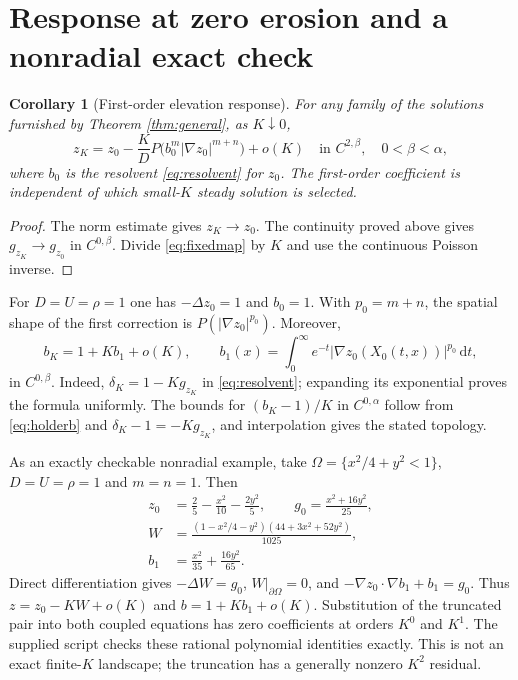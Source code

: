 \documentclass[11pt,a4paper]{article}
\newtheorem{corollary}[theorem]{Corollary}
\theoremstyle{definition}\newtheorem{definition}[theorem]{Definition}
\theoremstyle{remark}\newtheorem{remark}[theorem]{Remark}
\newcommand{\dd}{\,\mathrm d}
\begin{document}
\section{Response at zero erosion and a nonradial exact check}
\begin{corollary}[First-order elevation response]\label{cor:response}
For any family of the solutions furnished by Theorem \ref{thm:general}, as $K\downarrow0$,
\begin{equation}
 z_K=z_0-\frac K D P\big(b_0^m|\nabla z_0|^{m+n}\big)+o(K)
 \quad\text{in }C^{2,\beta},\quad 0<\beta<\alpha,\label{eq:response}
\end{equation}
where $b_0$ is the resolvent \eqref{eq:resolvent} for $z_0$. The first-order coefficient is independent of which small-$K$ steady solution is selected.
\end{corollary}
\begin{proof}
The norm estimate gives $z_K\to z_0$. The continuity proved above gives $g_{z_K}\to g_{z_0}$ in $C^{0,\beta}$. Divide \eqref{eq:fixedmap} by $K$ and use the continuous Poisson inverse.
\end{proof}

For $D=U=\rho=1$ one has $-\Delta z_0=1$ and $b_0=1$. With $p_0=m+n$, the spatial shape of the first correction is $P(|\nabla z_0|^{p_0})$. Moreover,
\begin{equation}
 b_K=1+K b_1+o(K),\qquad
 b_1(x)=\int_0^\infty e^{-t}|\nabla z_0(X_0(t,x))|^{p_0}\dd t,\label{eq:bresponse}
\end{equation}
in $C^{0,\beta}$. Indeed, $\delta_K=1-Kg_{z_K}$ in \eqref{eq:resolvent}; expanding its exponential proves the formula uniformly. The bounds for $(b_K-1)/K$ in $C^{0,\alpha}$ follow from \eqref{eq:holderb} and $\delta_K-1=-Kg_{z_K}$, and interpolation gives the stated topology.

As an exactly checkable nonradial example, take $\Omega=\{x^2/4+y^2<1\}$, $D=U=\rho=1$ and $m=n=1$. Then
\begin{align}
 z_0&=\frac25-\frac{x^2}{10}-\frac{2y^2}{5},\qquad
 g_0=\frac{x^2+16y^2}{25},\nonumber\\
 W&=\frac{(1-x^2/4-y^2)(44+3x^2+52y^2)}{1025},\label{eq:ellipse}\\
 b_1&=\frac{x^2}{35}+\frac{16y^2}{65}.\nonumber
\end{align}
Direct differentiation gives $-\Delta W=g_0$, $W|_{\partial\Omega}=0$, and
$-\nabla z_0\cdot\nabla b_1+b_1=g_0$.
Thus $z=z_0-KW+o(K)$ and $b=1+Kb_1+o(K)$. Substitution of the truncated pair into both coupled equations has zero coefficients at orders $K^0$ and $K^1$. The supplied script checks these rational polynomial identities exactly. This is not an exact finite-$K$ landscape; the truncation has a generally nonzero $K^2$ residual.
\end{document}
